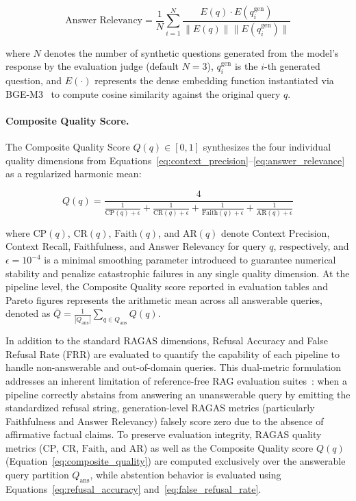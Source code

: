\begin{equation}
\label{eq:answer_relevance}
\text{Answer Relevancy} = \frac{1}{N} \sum_{i=1}^{N} \frac{E(q) \cdot E(q_i^{\text{gen}})}{\|E(q)\| \|E(q_i^{\text{gen}})\|}
\end{equation}

where $N$ denotes the number of synthetic questions generated from the model's response by the evaluation judge (default $N = 3$), $q_i^{\text{gen}}$ is the $i$-th generated question, and $E(\cdot)$ represents the dense embedding function instantiated via BGE-M3~\citep{chen2024bge} to compute cosine similarity against the original query $q$.

\paragraph{Composite Quality Score.} The Composite Quality Score $Q(q) \in [0, 1]$ synthesizes the four individual quality dimensions from Equations~\ref{eq:context_precision}--\ref{eq:answer_relevance} as a regularized harmonic mean:

\begin{equation}
\label{eq:composite_quality}
Q(q) = \frac{4}{\frac{1}{\text{CP}(q) + \epsilon} + \frac{1}{\text{CR}(q) + \epsilon} + \frac{1}{\text{Faith}(q) + \epsilon} + \frac{1}{\text{AR}(q) + \epsilon}}
\end{equation}

where $\text{CP}(q)$, $\text{CR}(q)$, $\text{Faith}(q)$, and $\text{AR}(q)$ denote Context Precision, Context Recall, Faithfulness, and Answer Relevancy for query $q$, respectively, and $\epsilon = 10^{-4}$ is a minimal smoothing parameter introduced to guarantee numerical stability and penalize catastrophic failures in any single quality dimension. At the pipeline level, the Composite Quality score reported in evaluation tables and Pareto figures represents the arithmetic mean across all answerable queries, denoted as $\bar{Q} = \frac{1}{|Q_{\text{ans}}|} \sum_{q \in Q_{\text{ans}}} Q(q)$.

In addition to the standard RAGAS dimensions, Refusal Accuracy and False Refusal Rate (FRR) are evaluated to quantify the capability of each pipeline to handle non-answerable and out-of-domain queries. This dual-metric formulation addresses an inherent limitation of reference-free RAG evaluation suites~\citep{es2024ragas}: when a pipeline correctly abstains from answering an unanswerable query by emitting the standardized refusal string, generation-level RAGAS metrics (particularly Faithfulness and Answer Relevancy) falsely score zero due to the absence of affirmative factual claims. To preserve evaluation integrity, RAGAS quality metrics ($\text{CP}$, $\text{CR}$, $\text{Faith}$, and $\text{AR}$) as well as the Composite Quality score $Q(q)$ (Equation~\ref{eq:composite_quality}) are computed exclusively over the answerable query partition $Q_{\text{ans}}$, while abstention behavior is evaluated using Equations~\ref{eq:refusal_accuracy} and~\ref{eq:false_refusal_rate}.

